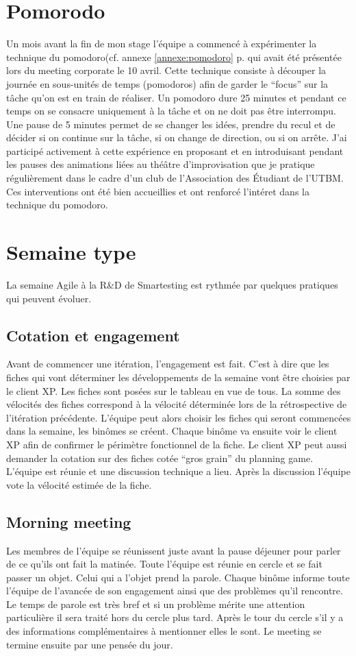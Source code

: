 \section{Pomorodo}
Un mois avant la fin de mon stage l'équipe a commencé à expérimenter la technique du pomodoro(cf. annexe \ref{annexe:pomodoro} p.\pageref{annexe:pomodoro} qui avait été présentée lors du meeting corporate le 10 avril. Cette technique consiste à découper la journée en sous-unités de temps (pomodoros) afin de garder le ``focus'' sur la tâche qu'on est en train de réaliser. Un pomodoro dure 25 minutes et pendant ce temps on se consacre uniquement à la tâche et on ne doit pas être interrompu. Une pause de 5 minutes permet de se changer les idées, prendre du recul et de décider si on continue sur la tâche, si on change de direction, ou si on arrête. J'ai participé activement à cette expérience en proposant et en introduisant pendant les pauses des animations liées au théâtre d'improvisation que je pratique régulièrement dans le cadre d'un club de l'Association des Étudiant de l'UTBM. Ces interventions ont été bien accueillies et ont renforcé l'intéret dans la technique du pomodoro.
\section{Semaine type}
La semaine Agile à la R\&D de Smartesting est rythmée par quelques pratiques qui peuvent évoluer.
\subsection*{Cotation et engagement}
Avant de commencer une itération, l'engagement est fait. C'est à dire que les fiches qui vont déterminer les développements de la semaine vont être choisies par le client XP. Les fiches sont posées sur le tableau en vue de tous. La somme des vélocités des fiches correspond à la vélocité déterminée lors de la rétrospective de l'itération précédente. L'équipe peut alors choisir les fiches qui seront commencées dans la semaine, les binômes se créent. Chaque binôme va ensuite voir le client XP afin de confirmer le périmètre fonctionnel de la fiche. Le client XP peut aussi demander la cotation sur des fiches cotée ``gros grain'' du planning game. L'équipe est réunie et une discussion technique a lieu. Après la discussion l'équipe vote la vélocité estimée de la fiche. 
\subsection*{Morning meeting}
Les membres de l'équipe se réunissent juste avant la pause déjeuner pour parler de ce qu'ils ont fait la matinée. Toute l'équipe est réunie en cercle et se fait passer un objet. Celui qui a l'objet prend la parole. Chaque binôme informe toute l'équipe de l'avancée de son engagement ainsi que des problèmes qu'il rencontre. Le temps de parole est très bref et si un problème mérite une attention particulière il sera traité hors du cercle plus tard. Après le tour du cercle s'il y a des informations complémentaires à mentionner elles le sont. Le meeting se termine ensuite par une pensée du jour.
